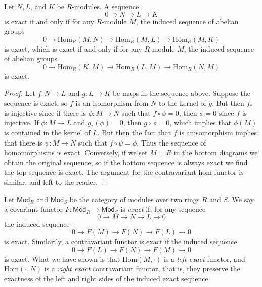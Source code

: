 \begin{lemma}
    Let $N,L$, and $K$ be $R$-modules. A sequence
    \[ 0 \to N \to L \to K \]
    is exact if and only if for any $R$-module $M$, the induced sequence of abelian groups
    \[ 0 \to \text{Hom}_R(M,N) \to \text{Hom}_R(M,L) \to \text{Hom}_R(M,K) \]
    is exact, which is exact if and only if for any $R$-module $M$, the induced sequence of abelian groups
    \[ 0 \to \text{Hom}_R(K,M) \to \text{Hom}_R(L,M) \to \text{Hom}_R(N,M) \]
    is exact.
\end{lemma}
\begin{proof}
    Let $f: N \to L$ and $g: L \to K$ be maps in the sequence above. Suppose the sequence is exact, so $f$ is an isomorphism from $N$ to the kernel of $g$. But then $f_*$ is injective since if there is $\phi: M \to N$ such that $f \circ \phi = 0$, then $\phi = 0$ since $f$ is injective. If $\phi: M \to L$ and $g_*(\phi) = 0$, then $g \circ \phi = 0$, which implies that $\phi(M)$ is contained in the kernel of $L$. But then the fact that $f$ is anisomorphism implies that there is $\psi: M \to N$ such that $f \circ \psi = \phi$. Thus the sequence of homomorphisms is exact. Conversely, if we set $M = R$ in the bottom diagrams we obtain the original sequence, so if the bottom sequence is always exact we find the top sequence is exact. The argument for the contravariant hom functor is similar, and left to the reader.
\end{proof}

Let $\mathsf{Mod}_R$ and $\mathsf{Mod}_S$ be the category of modules over two rings $R$ and $S$. We say a covariant functor $F: \mathsf{Mod}_R \to \mathsf{Mod}_S$ is \emph{exact} if, for any sequence
%
\[ 0 \to M \to N \to L \to 0 \]
%
the induced sequence
%
\[ 0 \to F(M) \to F(N) \to F(L) \to 0 \]
%
is exact. Similarily, a contravariant functor is exact if the induced sequence
%
\[ 0 \to F(L) \to F(N) \to F(M) \to 0 \]
%
is exact. What we have shown is that $\text{Hom}(M,\cdot)$ is a \emph{left exact} functor, and $\text{Hom}(\cdot,N)$ is a \emph{right exact} contravariant functor, that is, they preserve the exactness of the left and right sides of the induced exact sequence.

